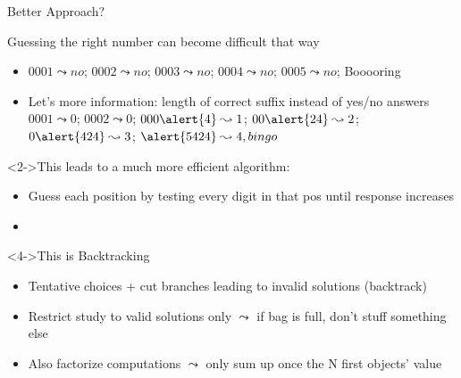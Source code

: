 \begin{frame}{Better Approach?}
  \begin{block}{Guessing the right number can become difficult that way}
    \begin{itemize}
    \item 
      $0001 \leadsto no$; $0002 \leadsto no$; $0003 \leadsto no$; 
      $0004 \leadsto no$; $0005 \leadsto no$; Booooring
    \item Let's more information: length of correct suffix instead of yes/no answers\\
      $0001 \leadsto 0$; $0002 \leadsto 0$; $000\alert{4} \leadsto 1$;
      $00\alert{24} \leadsto 2$; $0\alert{424} \leadsto 3$; $\alert{5424} \leadsto 4, bingo$
    \end{itemize}   
  \end{block}\vspace{-.6\baselineskip}
  \begin{block}<2->{This leads to a much more efficient algorithm:}
    \begin{itemize}
    \item Guess each position by testing every digit in that pos until response
      increases
    \item {}
    \end{itemize}
  \end{block}\vspace{-.6\baselineskip}

  \begin{block}<4->{This is Backtracking}
    \begin{itemize}\vspace{-.4\baselineskip}
    \item Tentative choices + cut branches leading to invalid solutions (backtrack)
    \item Restrict study to valid solutions only
      {\small $\leadsto$ if bag is full, don't stuff something else}\\
    \item Also factorize computations
      {\small $\leadsto$ only sum up once the N first objects' value}
    \end{itemize}    
  \end{block}
\end{frame}
